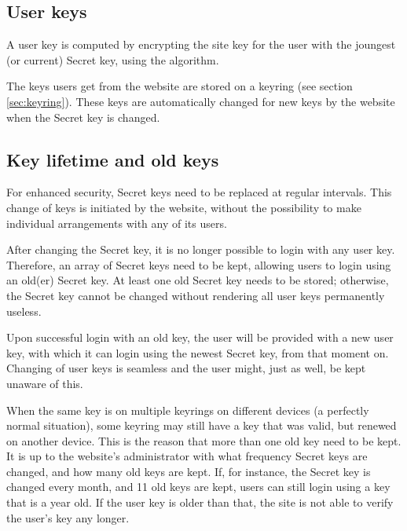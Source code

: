 \subsection{User keys}
\label{sec:userkeys}
A user key is computed by encrypting the site key for the user with the joungest (or current) Secret key,
using the  algorithm.
\par
The keys users get from the website are stored on a keyring (see section \ref{sec:keyring}).
These keys are automatically changed for new keys by the website when the Secret key is changed.

\subsection{Key lifetime and old keys}
For enhanced security, Secret keys need to be replaced at regular intervals.
This change of keys is initiated by the website,
without the possibility to make individual arrangements with any of its users.
\par
After changing the Secret key, it is no longer possible to login with any user key.
Therefore, an array of Secret keys need to be kept, allowing users to login using an old(er) Secret key.
At least one old Secret key needs to be stored; otherwise, the Secret key cannot be changed without rendering all user keys permanently useless.
\par
Upon successful login with an old key, the user will be provided with a new user key,
with which it can login using the newest Secret key, from that moment on.
Changing of user keys is seamless and the user might, just as well, be kept unaware of this.
\par
When the same key is on multiple keyrings on different devices
(a perfectly normal situation),
some keyring may still have a key that was valid, but renewed on another device.
This is the reason that more than one old key need to be kept.
It is up to the website's administrator with what frequency Secret keys are changed, and how many old keys are kept.
If, for instance, the Secret key is changed every month, and 11 old keys are kept, users can still login using a key that is a year old.
If the user key is older than that, the site is not able to verify the user's key any longer.

